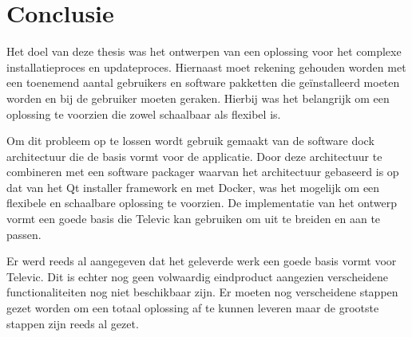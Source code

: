 \chapter{Conclusie}
Het doel van deze thesis was het ontwerpen van een oplossing voor het complexe installatieproces en updateproces.
Hiernaast moet rekening gehouden worden met een toenemend aantal gebruikers en software pakketten die geïnstalleerd moeten worden en bij de gebruiker moeten geraken.
Hierbij was het belangrijk om een oplossing te voorzien die zowel schaalbaar als flexibel is.

Om dit probleem op te lossen wordt gebruik gemaakt van de software dock architectuur die de basis vormt voor de applicatie.
Door deze architectuur te combineren met een software packager waarvan het architectuur gebaseerd is op dat van het Qt installer framework en met Docker, was het mogelijk om een flexibele en schaalbare oplossing te voorzien.
De implementatie van het ontwerp vormt een goede basis die Televic kan gebruiken om uit te breiden en aan te passen.

Er werd reeds al aangegeven dat het geleverde werk een goede basis vormt voor Televic.
Dit is echter nog geen volwaardig eindproduct aangezien verscheidene functionaliteiten nog niet beschikbaar zijn.
Er moeten nog verscheidene stappen gezet worden om een totaal oplossing af te kunnen leveren maar de grootste stappen zijn reeds al gezet.